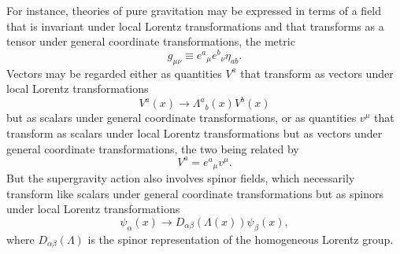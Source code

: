 For instance, theories of pure gravitation may be expressed in terms of
a field that is invariant under local Lorentz transformations and that
transforms as a tensor under general coordinate transformations, the
metric
\begin{equation}
  g_{\mu\nu}\equiv e^a{}_\mu e^b{}_\nu\eta_{ab}.
  \tag{31.A.4}\label{eq:31.A.4}
\end{equation}
Vectors may be regarded either as quantities \(V^a\) that transform as
vectors under local Lorentz transformations
\begin{equation}
  V^a(x)\longrightarrow\Lambda^a{}_b(x)V^b(x)
  \tag{31.A.5}\label{eq:31.A.5}
\end{equation}
but as scalars under general coordinate transformations, or as quantities
\(v^\mu\) that transform as scalars under local Lorentz transformations
but as vectors under general coordinate transformations, the two being
related by
\[
  V^a=e^a{}_\mu v^\mu.
\]
But the supergravity action also involves spinor fields, which necessarily
transform like scalars under general coordinate transformations but as
spinors under local Lorentz transformations
\begin{equation}
  \psi_\alpha(x)
  \longrightarrow
  D_{\alpha\beta}(\Lambda(x))\psi_\beta(x),
  \tag{31.A.6}\label{eq:31.A.6}
\end{equation}
where \(D_{\alpha\beta}(\Lambda)\) is the spinor representation of the
homogeneous Lorentz group.


